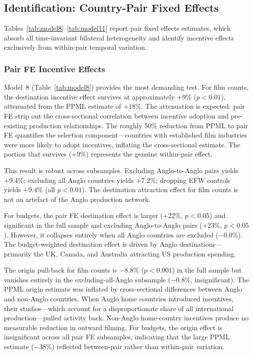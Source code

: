 \subsection{Identification: Country-Pair Fixed Effects}
\label{sec:pair_fe_results}

Tables~\ref{tab:model8}--\ref{tab:model11} report pair fixed effects estimates, which absorb all time-invariant bilateral heterogeneity and identify incentive effects exclusively from within-pair temporal variation.

\subsubsection{Pair FE Incentive Effects}

Model~8 (Table~\ref{tab:model8}) provides the most demanding test. For film counts, the destination incentive effect survives at approximately $+9\%$ ($p < 0.01$), attenuated from the PPML estimate of $+18\%$. The attenuation is expected: pair FE strip out the cross-sectional correlation between incentive adoption and pre-existing production relationships. The roughly 50\% reduction from PPML to pair FE quantifies the selection component---countries with established film industries were more likely to adopt incentives, inflating the cross-sectional estimate. The portion that survives ($+9\%$) represents the genuine within-pair effect.

This result is robust across subsamples. Excluding Anglo-to-Anglo pairs yields $+9.4\%$; excluding all Anglo countries yields $+7.2\%$; dropping EFW controls yields $+9.4\%$ (all $p < 0.01$). The destination attraction effect for film counts is not an artefact of the Anglo production network.

For budgets, the pair FE destination effect is larger ($+22\%$, $p < 0.05$) and significant in the full sample and excluding Anglo-to-Anglo pairs ($+23\%$, $p < 0.05$). However, it collapses entirely when all Anglo countries are excluded ($-0.0\%$). The budget-weighted destination effect is driven by Anglo destinations---primarily the UK, Canada, and Australia attracting US production spending.

The origin pull-back for film counts is $-8.8\%$ ($p < 0.001$) in the full sample but vanishes entirely in the excluding-all-Anglo subsample ($-0.8\%$, insignificant). The PPML origin estimate was inflated by cross-sectional differences between Anglo and non-Anglo countries. When Anglo home countries introduced incentives, their studios---which account for a disproportionate share of all international production---pulled activity back. Non-Anglo home-country incentives produce no measurable reduction in outward filming. For budgets, the origin effect is insignificant across all pair FE subsamples, indicating that the large PPML estimate ($-38\%$) reflected between-pair rather than within-pair variation.

